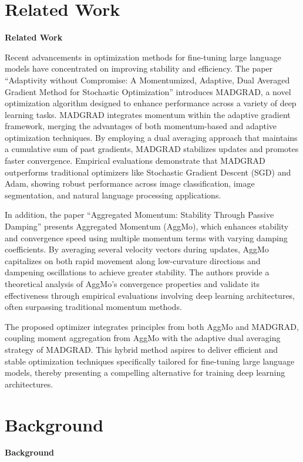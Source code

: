 \documentclass{article} %
\begin{document}
\section{Related Work}
\label{sec:related}
\textbf{Related Work}

Recent advancements in optimization methods for fine-tuning large language models have concentrated on improving stability and efficiency. The paper ``Adaptivity without Compromise: A Momentumized, Adaptive, Dual Averaged Gradient Method for Stochastic Optimization'' introduces MADGRAD, a novel optimization algorithm designed to enhance performance across a variety of deep learning tasks. MADGRAD integrates momentum within the adaptive gradient framework, merging the advantages of both momentum-based and adaptive optimization techniques. By employing a dual averaging approach that maintains a cumulative sum of past gradients, MADGRAD stabilizes updates and promotes faster convergence. Empirical evaluations demonstrate that MADGRAD outperforms traditional optimizers like Stochastic Gradient Descent (SGD) and Adam, showing robust performance across image classification, image segmentation, and natural language processing applications.

In addition, the paper ``Aggregated Momentum: Stability Through Passive Damping'' presents Aggregated Momentum (AggMo), which enhances stability and convergence speed using multiple momentum terms with varying damping coefficients. By averaging several velocity vectors during updates, AggMo capitalizes on both rapid movement along low-curvature directions and dampening oscillations to achieve greater stability. The authors provide a theoretical analysis of AggMo's convergence properties and validate its effectiveness through empirical evaluations involving deep learning architectures, often surpassing traditional momentum methods.

The proposed optimizer integrates principles from both AggMo and MADGRAD, coupling moment aggregation from AggMo with the adaptive dual averaging strategy of MADGRAD. This hybrid method aspires to deliver efficient and stable optimization techniques specifically tailored for fine-tuning large language models, thereby presenting a compelling alternative for training deep learning architectures.

\section{Background}
\label{sec:background}
\textbf{Background}
\end{document}
